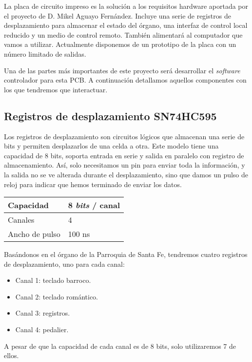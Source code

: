 La placa de circuito impreso es la solución a los requisitos hardware aportada por el proyecto de D. Mikel Aguayo Fernández. Incluye una serie de registros de desplazamiento para almacenar el estado del órgano, una interfaz de control local reducido y un medio de control remoto. También alimentará al computador que vamos a utilizar. Actualmente disponemos de un prototipo de la placa con un número limitado de salidas.

Una de las partes más importantes de este proyecto será desarrollar el \textit{software} controlador para esta PCB. A continuación detallamos aquellos componentes con los que tendremos que interactuar.

\subsection{Registros de desplazamiento SN74HC595}

Los registros de desplazamiento son circuitos lógicos que almacenan una serie de bits y permiten desplazarlos de una celda a otra. Este modelo tiene una capacidad de 8 bits, soporta entrada en serie y salida en paralelo con registro de almacenamiento. Así, solo necesitamos un pin para enviar toda la información, y la salida no se ve alterada durante el desplazamiento, sino que damos un pulso de reloj para indicar que hemos terminado de enviar los datos.

\begin{center}
		\begin{tabular}{|l|l|}
		\hline Capacidad & 8 \textit{bits} / canal \\ 
		\hline Canales & 4 \\ 
		\hline Ancho de pulso & 100 ns \\ 
		\hline 
	\end{tabular}
\end{center}

Basándonos en el órgano de la Parroquia de Santa Fe, tendremos cuatro registros de desplazamiento, uno para cada canal:

\begin{itemize}
	\item Canal 1: teclado barroco.
	\item Canal 2: teclado romántico.
	\item Canal 3: registros.
	\item Canal 4: pedalier.
\end{itemize}

A pesar de que la capacidad de cada canal es de 8 bits, solo utilizaremos 7 de ellos.

